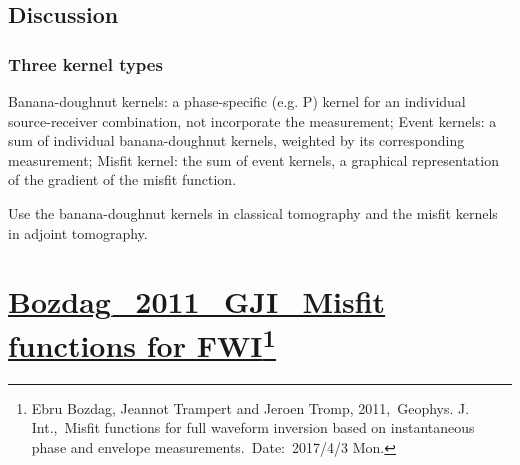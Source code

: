 \documentclass{article}
\newcommand{\Ppath}{/home/tche/Learning/Learning/Paper/}
\newcommand{\prf}{This is relative path from \Papth to the paper file}
\newcommand{\pmk}{This is the brief info.}
\newcommand{\pti}{This is the paper tile}
\newcommand{\pay}{These are authors and year}
\newcommand{\pjo}{This is the journal}
\newcommand{\pda}{This is the date}
\newcommand{\refp}[1]{\href{run:\Ppath\prf}{#1}}
\newcommand{\pinfo}{\refp{\pmk}\footnote{\pay,~\pjo,~\pti.~Date:~\pda}}
\begin{document}
\subsection{Discussion}
\subsubsection{Three kernel types}
Banana-doughnut kernels: a phase-specific (e.g. P) kernel for an individual source-receiver combination, not incorporate the measurement; Event kernels: a sum of individual banana-doughnut kernels, weighted by its corresponding measurement; Misfit kernel: the sum of event kernels, a graphical representation of the gradient of the misfit function.\par
Use the banana-doughnut kernels in classical tomography and the misfit kernels in adjoint tomography.\par
\vspace{5mm}

\renewcommand{\pmk}{Bozdag\_2011\_GJI\_Misfit functions for FWI}
\renewcommand{\prf}{FWI/\pmk.pdf}
\renewcommand{\pti}{Misfit functions for full waveform inversion based on instantaneous phase and envelope measurements}
\renewcommand{\pay}{Ebru Bozdag, Jeannot Trampert and Jeroen Tromp, 2011}
\renewcommand{\pjo}{Geophys. J. Int.}
\renewcommand{\pda}{2017/4/3 Mon.}
\section{\pinfo}
\end{document}
